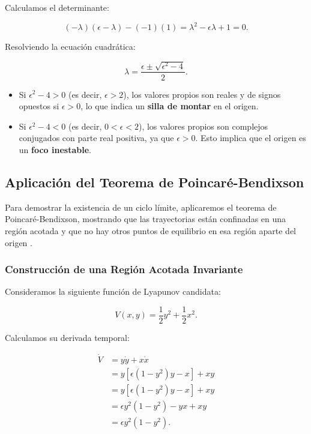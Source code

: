 Calculamos el determinante:

\begin{equation}
    (-\lambda)(\epsilon - \lambda) - (-1)(1) = \lambda^2 - \epsilon \lambda + 1 = 0.
\end{equation}

Resolviendo la ecuación cuadrática:

\begin{equation}
    \lambda = \dfrac{\epsilon \pm \sqrt{\epsilon^2 - 4}}{2}.
\end{equation}

\begin{itemize}
    \item Si \(\epsilon^2 - 4 > 0\) (es decir, \(\epsilon > 2\)), los valores propios son reales y de signos opuestos si \(\epsilon > 0\), lo que indica un \textbf{silla de montar} en el origen.
    \item Si \(\epsilon^2 - 4 < 0\) (es decir, \(0 < \epsilon < 2\)), los valores propios son complejos conjugados con parte real positiva, ya que \(\epsilon > 0\). Esto implica que el origen es un \textbf{foco inestable}.
\end{itemize}

\subsection*{Aplicación del Teorema de Poincaré-Bendixson}

Para demostrar la existencia de un ciclo límite, aplicaremos el teorema de Poincaré-Bendixson, mostrando que las trayectorias están confinadas en una región acotada y que no hay otros puntos de equilibrio en esa región aparte del origen \cite{wiggins2003introduction}.

\subsubsection{Construcción de una Región Acotada Invariante}

Consideramos la siguiente función de Lyapunov candidata:

\begin{equation}
    V(x, y) = \dfrac{1}{2} y^2 + \dfrac{1}{2} x^2.
\end{equation}

Calculamos su derivada temporal:

\begin{align}
    \dot{V} &= y \dot{y} + x \dot{x} \\
    &= y \left[ \epsilon \left(1 - y^2\right) y - x \right] + x y \\
    &= y \left[ \epsilon \left(1 - y^2\right) y - x \right] + x y \\
    &= \epsilon y^2 \left(1 - y^2\right) - y x + x y \\
    &= \epsilon y^2 \left(1 - y^2\right).
\end{align}

